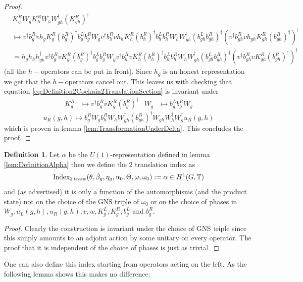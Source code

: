 \documentclass[12pt,a4paper,twoside]{article}
\newcommand{\defeq}{\vcentcolon=}
\newcommand{\TT}{\mathbb T}
\theoremstyle{definition}
\newtheorem{definition}[theorem]{Definition}
\numberwithin{equation}{section}
\begin{document}
\begin{proof}
	\begin{align}
		&K_g^R W_g K_h^R W_ hW_{gh}^\dagger(K_{gh}^R)^\dagger\\
		&\mapsto v^\dagger b_g^R v h_g K_g^R (b_g^R)^\dagger b_g^Lb_g^RW_g v^\dagger b_h^R v h_h K_h^R (b_h^R)^\dagger b_h^Lb_h^RW_h W_{gh}^\dagger (b_{gh}^Lb_{gh}^R)^\dagger (v^\dagger b_{gh}^R v h_{gh} K_{gh}^R (b_{gh}^R)^\dagger)^\dagger\\
		&=h_gh_hh_{gh}^\dagger v^\dagger b_g^R v  K_g^R (b_g^R)^\dagger b_g^Lb_g^RW_g v^\dagger b_h^R v  K_h^R (b_h^R)^\dagger b_h^Lb_h^RW_h W_{gh}^\dagger (b_{gh}^Lb_{gh}^R)^\dagger (v^\dagger b_{gh}^R v  K_{gh}^R (b_{gh}^R)^\dagger)^\dagger
	\end{align}
	(all the $h-$operators can be put in front). Since $h_g$ is an honest representation we get that the $h-$operators cancel out. This leaves us with checking that equation \eqref{eq:Definition2Cochain2TranslationSection} is invariant under
	\begin{align}
		K_g^R&\mapsto v^\dagger b_g^R v K_g^R (b_g^R)^\dagger&W_g&\mapsto b_g^Lb_g^RW_g
	\end{align}
	\begin{equation}
		u_R(g,h)\mapsto b_g^R W_g b_h^R W_h W_{gh}^\dagger (b_{gh}^R)^\dagger W_{gh}W_h^\dagger W_g^\dagger u_R(g,h)
	\end{equation}
	which is proven in lemma \ref{lem:TransformationUnderDelta}. This concludes the proof.
\end{proof}
\begin{definition}
	Let $\alpha$ be the $U(1)$-representation defined in lemma \ref{lem:DefinitionAlpha} then we define the 2 translation index as
	\begin{equation}
		\textrm{Index}_{2\:\text{trans}}(\theta,\tilde{\beta}_g,\eta_g,\alpha_0,\Theta,\omega,\omega_0)\defeq \alpha\in H^1(G,\TT)
	\end{equation}
	and (as advertised) it is only a function of the automorphisms (and the product state) not on the choice of the GNS triple of $\omega_0$ or on the choice of phases in $W_g,u_L(g,h),u_R(g,h),v,w,K^L_g,K^R_g,b^L_g$ and $b^R_g$.
\end{definition}
\begin{proof}
	Clearly the construction is invariant under the choice of GNS triple since this simply amounts to an adjoint action by some unitary on every operator. The proof that it is independent of the choice of phases is just as trivial.
\end{proof}
One can also define this index starting from operators acting on the left. As the following lemma shows this makes no difference:
\end{document}
